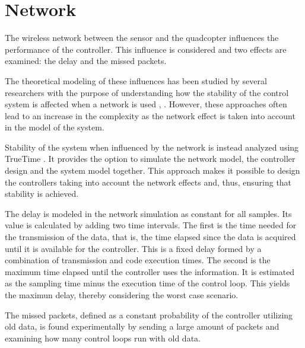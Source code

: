 \section{Network}\label{sec:network}
The wireless network between the sensor and the quadcopter influences the performance of the controller. This influence is considered and two effects are examined: the delay and the missed packets.


The theoretical modeling of these influences has been studied by several researchers with the purpose of understanding how the stability of the control system is affected when a network is used \cite{ling}, \cite{nirupam}. However, these approaches often lead to an increase in the complexity as the network effect is taken into account in the model of the system.

Stability of the system when influenced by the network is instead analyzed using TrueTime \cite{TrueTimeNew}. It provides the option to simulate the network model, the controller design and the system model together. This approach makes it possible to design the controllers taking into account the network effects and, thus, ensuring that stability is achieved.

The delay is modeled in the network simulation as constant for all samples. Its value is calculated by adding two time intervals. The first is the time needed for the transmission of the data, that is, the time elapsed since the data is acquired until it is available for the controller. This is a fixed delay formed by a combination of transmission and code execution times. The second is the maximum time elapsed until the controller uses the information. It is estimated as the sampling time minus the execution time of the control loop. This yields the maximun delay, thereby considering the worst case scenario.

The missed packets, defined as a constant probability of the controller utilizing old data, is found experimentally by sending a large amount of packets and examining how many control loops run with old data. 
